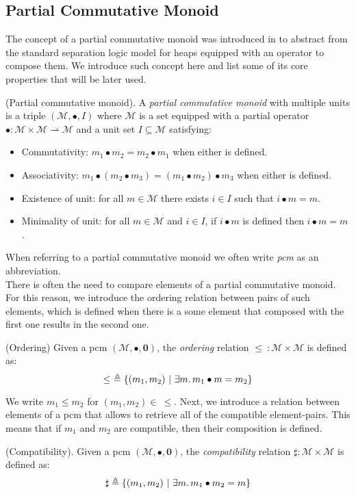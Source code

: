 \subsection{Partial Commutative Monoid}

\label{sec:pcm}

The concept of a partial commutative monoid was introduced in \cite{sepalgebra} to abstract from the standard separation logic model for heaps equipped with an operator to compose them. We introduce such concept here and list some of its core properties that will be later used.

\begin{defn}
	(Partial commutative monoid).
	A \emph{partial commutative monoid} with multiple units \cite{views} is a triple $(\mathcal{M}, \bullet, I)$ where $\mathcal{M}$ is a set equipped with a partial operator $\bullet : \mathcal{M} \times \mathcal{M} \rightharpoonup \mathcal{M}$ and a unit set $I \subseteq \mathcal{M}$ satisfying:
	\begin{itemize}
		\item Commutativity: $m_1 \bullet m_2 = m_2 \bullet m_1$ when either is defined.
		\item Associativity: $m_1 \bullet (m_2 \bullet m_3) = (m_1 \bullet m_2) \bullet m_3$ when either is defined.
		\item Existence of unit: for all $m \in \mathcal{M}$ there exists $i \in I$ such that $i \bullet m = m$.
		\item Minimality of unit: for all $m \in \mathcal{M}$ and $i \in I$, if $i \bullet m$ is defined then $i \bullet m = m$.
	\end{itemize}
\end{defn}
When referring to a partial commutative monoid we often write \emph{pcm} as an abbreviation. \\

There is often the need to compare elements of a partial commutative monoid. For this reason, we introduce the ordering relation between pairs of such elements, which is defined when there is a some element that composed with the first one results in the second one.
\begin{defn}
	(Ordering)
	Given a pcm $(\mathcal{M}, \bullet, \mathbf{0})$, the \emph{ordering} relation $\leq\ : \mathcal{M} \times \mathcal{M}$ is defined as:
\[
	\leq\ \triangleq \{ (m_1, m_2)\ |\ \exists m \ldotp m_1 \bullet m = m_2 \}
\]
\end{defn}
We write $m_1 \leq m_2$ for $(m_1, m_2) \in\ \leq$. Next, we introduce a relation between elements of a pcm that allows to retrieve all of the compatible element-pairs. This means that if $m_1$ and $m_2$ are compatible, then their composition is defined.

\begin{defn}
	(Compatibility).
	Given a pcm $(\mathcal{M}, \bullet, \mathbf{0})$, the \emph{compatibility} relation $\sharp : \mathcal{M} \times \mathcal{M}$ is defined as:
\[
	\sharp \triangleq \{ (m_1, m_2)\ |\ \exists m \ldotp m_1 \bullet m_2 = m \}
\]
\end{defn}